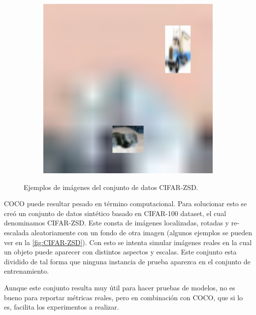 \begin{figure}[]
\begin{center}
\begin{subfigure}{.3\textwidth}
			\label{fig:ex2}
		\end{subfigure}
		\begin{subfigure}{.3\textwidth}
			\includegraphics[width=1\textwidth]{img/cifar-zsd-test283.jpg}
			\label{fig:ex3}
		\end{subfigure}
		\caption{Ejemplos de imágenes del conjunto de datos CIFAR-ZSD.}
		\label{fig:CIFAR-ZSD}
	\end{center}
\end{figure}

COCO puede resultar pesado en término computacional. Para solucionar esto se creó un conjunto de datos sintético basado en CIFAR-100 dataset, el cual denominamos CIFAR-ZSD. Este consta de imágenes localizadas, rotadas y re-escalada aleatoriamente con un fondo de otra imagen (algunos ejemplos se pueden ver en la \autoref{fig:CIFAR-ZSD}). Con esto se intenta simular imágenes reales en la cual un objeto puede aparecer con distintos aspectos y escalas. Este conjunto esta dividido de tal forma que ninguna instancia de prueba  aparezca en el conjunto de entrenamiento.

Aunque este conjunto resulta muy útil para hacer pruebas de modelos, no es bueno para reportar métricas reales, pero en combinación con COCO, que si lo es, facilita los experimentos a realizar.


